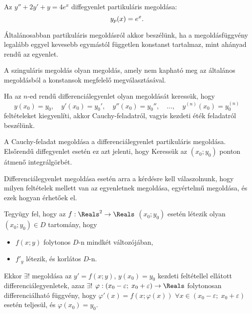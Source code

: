 \begin{example}
  Az $y'' + 2y' + y = 4e^x$ diffegyenlet partikuláris megoldása:
  \begin{equation*}
    y_p(x) = e^x
    \text.
  \end{equation*}
\end{example}

\begin{note}
  Általánosabban partikuláris megoldásról akkor beszélünk, ha a megoldásfüggvény
  legalább eggyel kevesebb egymástól független konstanst tartalmaz, mint ahányad
  rendű az egyenlet.
\end{note}

\begin{definition}
  A szinguláris megoldás olyan megoldás, amely nem kapható meg az általános
  megoldásból a konstansok megfelelő megválasztásával.
\end{definition}

\begin{definition}
  Ha az $n$-ed rendű differenciálegyenlet olyan megoldását keressük, hogy
  \begin{equation*}
    y(x_0) = y_0, \quad
    y'(x_0) = y_0', \quad
    y''(x_0) = y_0'', \quad
    \dots, \quad
    y^{(n)}(x_0) = y_0^{(n)}
  \end{equation*}
  feltételeket kiegyenlíti, akkor Cauchy-feladatról, vagyis kezdeti éték
  feladatról beszélünk.
\end{definition}

\begin{note}
  A Cauchy-feladat megoldása a differenciálegyenlet partikuláris megoldása.
  Elsőrendű diffegyenlet esetén ez azt jelenti, hogy Keressük az $(x_0; y_0)$
  ponton átmenő integrálgörbét.
\end{note}

\begin{note}
  Differenciálegyenlet megoldása esetén arra a kérdésre kell válaszolnunk, hogy
  milyen feltételek mellett van az egyenletnek megoldása, egyértelmű megoldása,
  és ezek hogyan érhetőek el.
\end{note}

\begin{definition}
  Tegyügy fel, hogy az $f: \Reals^2 \rightarrow \Reals$
  $\left( x_0 ; y_0 \right)$ esetén létezik olyan
  $\left( x_0 ; y_0 \right) \in D$ tartomány, hogy
  \begin{itemize}
    \item $f(x; y)$ folytonos $D$-n mindkét változójában,
    \item $f'_y$ létezik, és korlátos $D$-n.
  \end{itemize}
  Ekkor $\exists!$ megoldása az $y' = f(x; y)$, $y(x_0) = y_0$
  kezdeti feltétellel ellátott differenciálegyenletek, azaz
  $\exists!$ $\varphi :
    \left( x_0 - \varepsilon; \; x_0 + \varepsilon \right)
    \rightarrow \Reals$ folytonosan differenciálható függvény,
  hogy $\varphi' (x) = f \left(x ; \varphi(x)\right)$
  $\forall x \in \left( x_0 - \varepsilon; \; x_0 + \varepsilon \right)$
  esetén teljesül, és $\varphi(x_0) = y_0$.
\end{definition}

